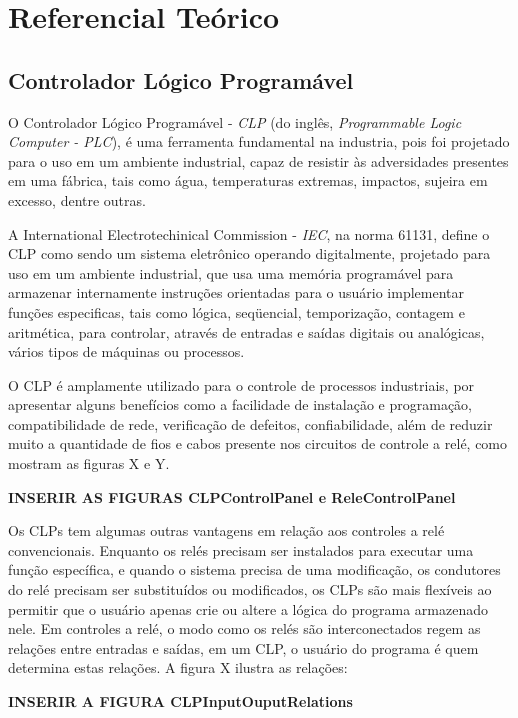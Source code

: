 \documentclass[a4paper, 12pt]{article}
\begin{document}
\section{Referencial Teórico}

	\subsection{Controlador Lógico Programável}
	
	O Controlador Lógico Programável - \textit{CLP} (do inglês, \textit{Programmable Logic Computer - PLC}),
	é uma ferramenta fundamental na industria, pois foi projetado para o uso em um
	ambiente industrial, capaz de resistir às adversidades presentes em uma fábrica,
	tais como água, temperaturas extremas, impactos, sujeira em excesso, dentre outras.
		
	A International Electrotechinical Commission - \textit{IEC}, na norma 61131, define
	o CLP como sendo um sistema eletrônico operando digitalmente, projetado 
	para uso em um ambiente industrial, que usa uma  	memória programável para armazenar
	internamente instruções orientadas para o usuário implementar funções especificas,
	tais como lógica, seqüencial, temporização, contagem e aritmética, para controlar,
	através de entradas e saídas	digitais ou analógicas, vários tipos de máquinas ou 
	processos.
	
	O CLP é amplamente utilizado para o controle de processos industriais, por apresentar
	alguns benefícios como a facilidade de instalação e programação, compatibilidade de rede,
	verificação de defeitos, confiabilidade, além de reduzir muito a quantidade de fios e cabos
	presente nos circuitos de controle a relé, como mostram as figuras X e Y.
	
	\textbf{INSERIR AS FIGURAS CLPControlPanel e ReleControlPanel}
	
	Os CLPs tem algumas outras vantagens em relação aos controles a relé convencionais. Enquanto os relés
	precisam ser instalados para executar uma função específica, e quando o sistema precisa de uma modificação,
	os condutores do relé precisam ser substituídos ou modificados, os CLPs são mais flexíveis ao permitir
	que o usuário apenas crie ou altere a lógica do programa armazenado nele.
	Em controles a relé, o modo como os relés são interconectados regem as relações entre	entradas e saídas,
	em um CLP, o usuário do programa é quem determina estas relações. A figura X ilustra as relações:
	
	\textbf{INSERIR A FIGURA CLPInputOuputRelations}
	
\end{document}
